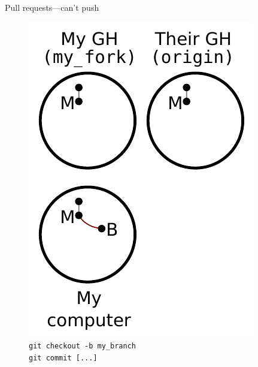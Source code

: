 \begin{frame}{Pull requests---can't push}
  \begin{figure}
    \includegraphics{fork_004.pdf}
    \\ \texttt{git checkout -b my\_branch}
    \\ \texttt{git commit [...]}
  \end{figure}
\end{frame}


